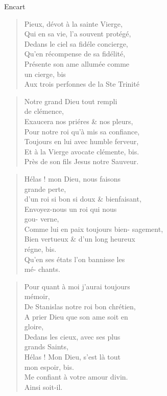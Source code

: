 \begin{diary}{Encart}{}
        \begin{verse}Pieux, dévot à la sainte Vierge,\\Qui en sa vie, l’a souvent protégé,\\Dedans le ciel sa fidéle concierge,\\Qu'en récompense de sa fidélité,\\Présente son ame allumée comme\\un cierge, bis\\Aux trois perfonnes de la Ste Trinité\\\end{verse}
        \bigskip

        \begin{verse}Notre grand Dieu tout rempli\\de clémence,\\Exaucera nos priéres \& nos pleurs,\\Pour notre roi qu'à mis sa
                                 confiance,\\Toujours en lui avec humble ferveur,\\Et à la Vierge avocate clémente, bis.\\Près de son fils Jesus notre Sauveur.\\\end{verse}
        \bigskip

        \begin{verse}Hélas ! mon Dieu, nous faisons\\grande perte,\\d'un roi si bon si doux
                                 \& bienfaisant,\\Envoyez-nous un roi qui nous\\gou-
                                    verne,\\Comme lui en paix toujours bien-
                                 sagement,\\Bien
                                 vertueux \& d'un long heureux\\régne, bis.\\Qu’en ses états l’on bannisse les\\mé-
                                    chants.\\\end{verse}
        \bigskip

        \begin{verse}Pour quant à moi j'aurai toujours\\mémoir,\\De Stanislas notre roi bon
                                 chrétien,\\A prier Dieu que son ame soit en\\gloire,\\Dedans les cieux, avec ses plus\\grands Saints,\\Hélas ! Mon Dieu, s'est là tout\\mon espoir, bis.\\Me confiant à votre amour divin.\\Ainsi soit-il.\\\end{verse}
        \bigskip


\end{diary}
